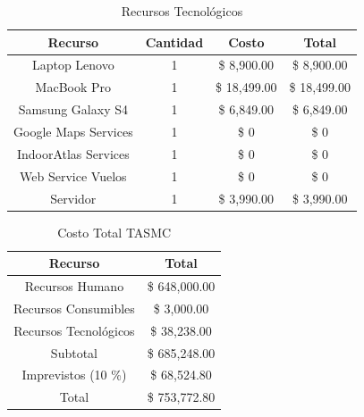 \begin{table} 
	\begin{center}
		\begin{tabular}{|c|c|c|c|}
			\hline \rowcolor[RGB]{0,102,204} 
			\textcolor{blanco}{\bf Recurso} &
				\textcolor{blanco}{\bf Cantidad} &
				\textcolor{blanco}{\bf Costo} &
				\textcolor{blanco}{\bf Total} \\
			\hline \rowcolor[RGB]{224,224,224} 
				Laptop Lenovo &
				1 &
				\$ 8,900.00 &
				\$ 8,900.00  \\
      		\hline 
      			MacBook Pro &
				1 &
				\$ 18,499.00&
				\$ 18,499.00 \\
			\hline \rowcolor[RGB]{224,224,224} 
				Samsung Galaxy S4 &
				1 &
				\$ 6,849.00 &
				\$ 6,849.00  \\
      		\hline 
      			Google Maps Services &
				1 &
				\$ 0 &
				\$ 0 \\
			\hline \rowcolor[RGB]{224,224,224} 
				IndoorAtlas Services &
				1 &
				\$ 0 &
				\$ 0 \\
      		\hline 
      			Web Service Vuelos &
				1 &
				\$ 0 &
				\$ 0 \\
			\hline \rowcolor[RGB]{224,224,224} 
				Servidor &
				1 &
				\$ 3,990.00 &
				\$ 3,990.00 \\	
      		\hline 
    		\end{tabular}
	\end{center}
	\caption[Recursos Tecnológicos]{Recursos Tecnológicos} 
	\label{tab:recursosTecnologicos}
\end{table}

\begin{table} 
	\begin{center}
		\begin{tabular}{|c|c|}
			\hline \rowcolor[RGB]{0,102,204} 
			\textcolor{blanco}{\bf Recurso} &
				\textcolor{blanco}{\bf Total} \\
			\hline \rowcolor[RGB]{224,224,224} 
				Recursos Humano &
				\$ 648,000.00  \\
      		\hline 
      			Recursos Consumibles &
				\$ 3,000.00  \\
			\hline \rowcolor[RGB]{224,224,224} 
				Recursos Tecnológicos &
				\$ 38,238.00  \\
      		\hline 
      			Subtotal &
				\$ 685,248.00  \\
			\hline \rowcolor[RGB]{224,224,224} 
				Imprevistos (10 \%) &
				\$ 68,524.80  \\
      		\hline 
      			Total &
				\$ 753,772.80 \\
      		\hline 
    		\end{tabular}
	\end{center}
	\caption[Costo Total TASMC]{Costo Total TASMC} 
	\label{tab:costoTasmc}
\end{table}

